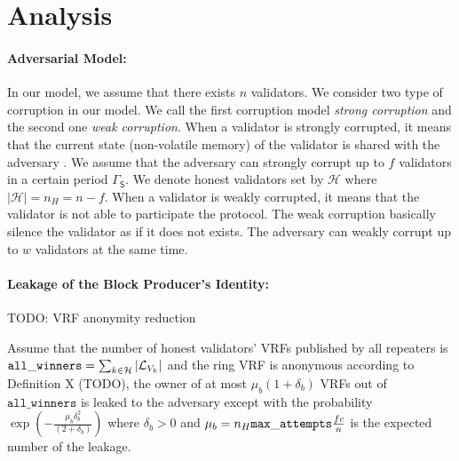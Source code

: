\newcommand{\nweak}{\ensuremath{w}}
\newcommand{\strongperiod}{\ensuremath{\mathsf{\Gamma_S}}}
\newcommand{\thweak}{\ensuremath{\tau_w}}
\newcommand{\numleak}{\ensuremath{\mathsf{leak}}}
\newcommand{\numanom}{\ensuremath{\mathtt{num\_anon}}}
\newcommand{\vrfwinners}{\ensuremath{\mathtt{all\_winners}}}
\section{Analysis}

\paragraph{Adversarial Model:} In our model, we assume that there exists $ n $ validators.  We consider two type of corruption in our model. We call the first corruption model \emph{strong corruption} and the second one \emph{weak corruption}. When a validator is strongly corrupted, it means that the current state (non-volatile memory) of the validator is shared with the adversary . We assume that the adversary can strongly corrupt up to $ f $ validators in a certain period $\strongperiod$.  We denote honest validators set by $ \mathcal{H} $ where $ |\mathcal{H}| = n_H = n-f $. 
When a validator is weakly corrupted, it means that the validator is not able to participate the protocol. The weak corruption basically silence the validator as if it does not exists. The adversary can weakly corrupt up to $ \nweak $ validators at the same time. 


\paragraph{Leakage of the Block Producer's Identity:}

TODO: VRF anonymity reduction


\begin{lemma}
Assume that the number of honest validators' VRFs published by all repeaters is $ \vrfwinners =  \sum_{k \in \mathcal{H}} |\vrfwinninglist_{V_k}| $ and the ring VRF is anonymous according to Definition X (TODO), the owner of at most $ \mu_{b} (1+\delta_b) $ VRFs out of $ \vrfwinners $ is leaked to the adversary except with the probability  $  \exp(-\frac{\mu_b\delta_b^2}{(2+\delta_b)}) $ where $ \delta_b > 0$ and $ \mu_b = n_H \mathtt{max\_attempts} \frac{fc}{n} $ is the expected number of the leakage.
\end{lemma}

